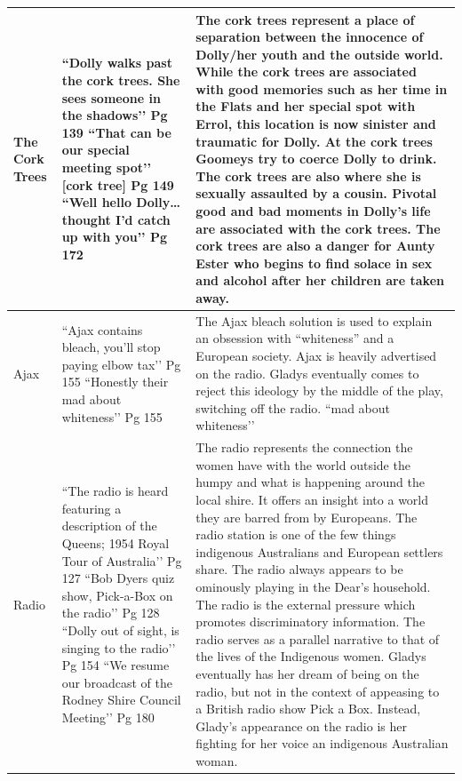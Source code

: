 \documentclass[a4paper]{article}
\begin{document}
\begin{longtable}{|p{2cm}|p{4cm}|p{7cm}|}
The Cork Trees &
``Dolly walks past the cork trees. She sees someone in the shadows’’ Pg 139 \newline
``That can be our special meeting spot’’ [cork tree] Pg 149 \newline
``Well hello Dolly… thought I’d catch up with you’’ Pg 172 &
The cork trees represent a place of separation between the innocence of Dolly/her youth and the outside world. While the cork trees are associated with good memories such as her time in the Flats and her special spot with Errol, this location is now sinister and traumatic for Dolly. At the cork trees Goomeys try to coerce Dolly to drink. The cork trees are also where she is sexually assaulted by a cousin. Pivotal good and bad moments in Dolly’s life are associated with the cork trees. The cork trees are also a danger for Aunty Ester who begins to find solace in sex and alcohol after her children are taken away. \\
\hline

Ajax &
``Ajax contains bleach, you’ll stop paying elbow tax’’ Pg 155 \newline
``Honestly their mad about whiteness’’ Pg 155 &
The Ajax bleach solution is used to explain an obsession with “whiteness” and a European society. Ajax is heavily advertised on the radio. Gladys eventually comes to reject this ideology by the middle of the play, switching off the radio. “mad about whiteness’’ \\
\hline

Radio &
``The radio is heard featuring a description of the Queens; 1954 Royal Tour of Australia’’ Pg 127 \newline
``Bob Dyers quiz show, Pick-a-Box on the radio’’ Pg 128 \newline
``Dolly out of sight, is singing to the radio’’ Pg 154 \newline
``We resume our broadcast of the Rodney Shire Council Meeting’’ Pg 180 &
The radio represents the connection the women have with the world outside the humpy and what is happening around the local shire. It offers an insight into a world they are barred from by Europeans. The radio station is one of the few things indigenous Australians and European settlers share. The radio always appears to be ominously playing in the Dear’s household. The radio is the external pressure which promotes discriminatory information. \newline
The radio serves as a parallel narrative to that of the lives of the Indigenous women. Gladys eventually has her dream of being on the radio, but not in the context of appeasing to a British radio show Pick a Box. Instead, Glady’s appearance on the radio is her fighting for her voice an indigenous Australian woman. \\
\hline


\end{longtable}
\end{document}
